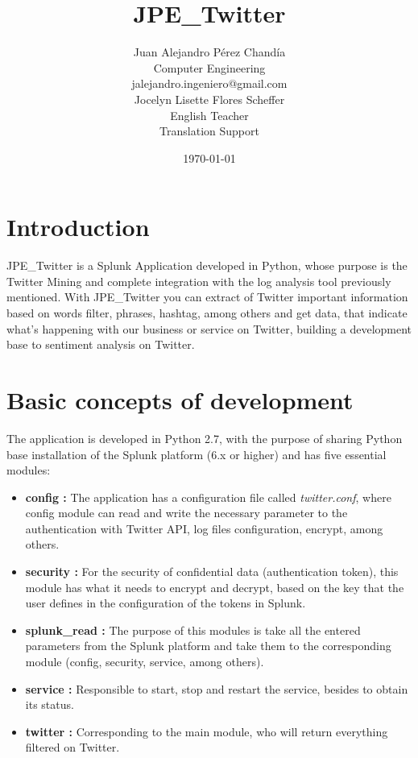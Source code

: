 \documentclass[report]{article}
\title{JPE\_Twitter} %
\author{%
    Juan Alejandro P\'erez Chand\'ia \\
    Computer Engineering\\
    jalejandro.ingeniero@gmail.com\\
    \vspace{1cm}
    Jocelyn Lisette Flores Scheffer\\
    English Teacher\\
    Translation Support
}
\date{\today}
\begin{document}
\renewcommand*\contentsname{\color{skde}Contents}
\pagecolor{background}
\color{text}
\sloppy 


\addtocounter{page}{1}

\section{Introduction}
JPE\_Twitter is a Splunk Application developed in Python, whose purpose is the Twitter Mining and complete integration with the log analysis tool previously mentioned. With JPE\_Twitter you can extract of Twitter important information based on words filter,
phrases, hashtag, among others and get data, that indicate what’s happening with our business or service on Twitter, building a development base to sentiment analysis on Twitter.
\newpage
\tableofcontents
\thispagestyle{empty}

\newpage
\section{Basic concepts of development}

The application is developed in Python 2.7, with the purpose of sharing Python base installation of the Splunk platform (6.x or higher) and has five essential modules:
\newline
\begin{itemize}
\item {\bf config :} The application has a configuration file called \textit{twitter.conf}, where config module can read and write the necessary parameter to the authentication with Twitter API, log files configuration, encrypt, among others.

\item {\bf security :} For the security of confidential data (authentication token), this module has what it needs to encrypt and decrypt, based on the key that the user defines in the configuration of the tokens in Splunk.

\item {\bf splunk\_read :} The purpose of this modules is take all the entered parameters from the Splunk platform and take them to the corresponding module (config, security, service, among others).

\item {\bf service :} Responsible to start, stop and restart the service, besides to obtain its status.

\item {\bf twitter :} Corresponding to the main module, who will return everything filtered on Twitter.
\newline
\end{itemize}
\end{document}
